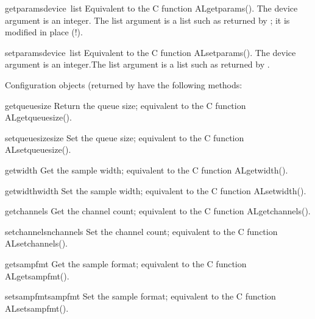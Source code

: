 \begin{funcdesc}{getparams}{device\, list}
Equivalent to the C function ALgetparams().  The device argument is an
integer.  The list argument is a list such as returned by
; it is modified in place (!).
\end{funcdesc}

\begin{funcdesc}{setparams}{device\, list}
Equivalent to the C function ALsetparams().  The device argument is an
integer.The list argument is a list such as returned by
.
\end{funcdesc}

Configuration objects (returned by  have the
following methods:

\renewcommand{\indexsubitem}{(audio configuration object method)}
\begin{funcdesc}{getqueuesize}{}
Return the queue size; equivalent to the C function ALgetqueuesize().
\end{funcdesc}

\begin{funcdesc}{setqueuesize}{size}
Set the queue size; equivalent to the C function ALsetqueuesize().
\end{funcdesc}

\begin{funcdesc}{getwidth}{}
Get the sample width; equivalent to the C function ALgetwidth().
\end{funcdesc}

\begin{funcdesc}{getwidth}{width}
Set the sample width; equivalent to the C function ALsetwidth().
\end{funcdesc}

\begin{funcdesc}{getchannels}{}
Get the channel count; equivalent to the C function ALgetchannels().
\end{funcdesc}

\begin{funcdesc}{setchannels}{nchannels}
Set the channel count; equivalent to the C function ALsetchannels().
\end{funcdesc}

\begin{funcdesc}{getsampfmt}{}
Get the sample format; equivalent to the C function ALgetsampfmt().
\end{funcdesc}

\begin{funcdesc}{setsampfmt}{sampfmt}
Set the sample format; equivalent to the C function ALsetsampfmt().
\end{funcdesc}

